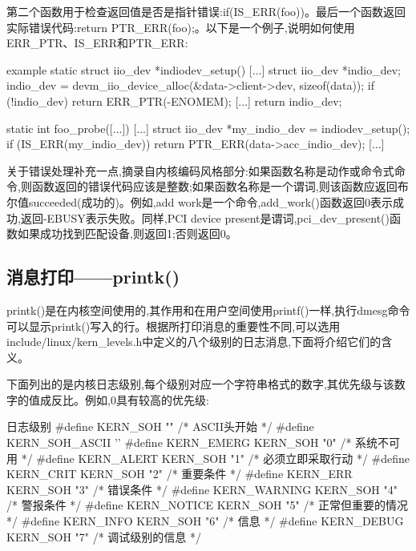\documentclass[lang=cn,newtx,10pt,scheme=chinese]{elegantbook}
\begin{document}
第二个函数用于检查返回值是否是指针错误:if(IS\_ERR(foo))。最后一个函数返回实际错误代码:return PTR\_ERR(foo);。以下是一个例子,说明如何使用ERR\_PTR、IS\_ERR和PTR\_ERR:

\begin{mycode}{example}
static struct iio_dev *indiodev_setup(){
    [...]
    struct iio_dev *indio_dev;
    indio_dev = devm_iio_device_alloc(&data->client->dev, sizeof(data));
    if (!indio_dev)
        return ERR_PTR(-ENOMEM);
    [...]
    return indio_dev;
}

static int foo_probe([...]){
    [...]
    struct iio_dev *my_indio_dev = indiodev_setup();
    if (IS_ERR(my_indio_dev))
        return PTR_ERR(data->acc_indio_dev);
    [...]
}
\end{mycode}

\begin{marker}
关于错误处理补充一点,摘录自内核编码风格部分:如果函数名称是动作或命令式命令,则函数返回的错误代码应该是整数;如果函数名称是一个谓词,则该函数应返回布尔值succeeded(成功的)。例如,add
work是一个命令,add\_work()函数返回0表示成功,返回-EBUSY表示失败。同样,PCI device present是谓词,pci\_dev\_present()函数如果成功找到匹配设备,则返回1;否则返回0。
\end{marker}

\subsection{消息打印——printk()}

printk()是在内核空间使用的,其作用和在用户空间使用printf()一样,执行dmesg命令可以显示printk()写入的行。根据所打印消息的重要性不同,可以选用include/linux/kern\_levels.h中定义的八个级别的日志消息,下面将介绍它们的含义。

下面列出的是内核日志级别,每个级别对应一个字符串格式的数字,其优先级与该数字的值成反比。例如,0具有较高的优先级:

\begin{mycode}{日志级别}
#define KERN_SOH                ""          /* ASCII头开始 */
#define KERN_SOH_ASCII          ''
#define KERN_EMERG              KERN_SOH "0"    /* 系统不可用 */
#define KERN_ALERT              KERN_SOH "1"    /* 必须立即采取行动 */
#define KERN_CRIT               KERN_SOH "2"    /* 重要条件 */
#define KERN_ERR                KERN_SOH "3"    /* 错误条件 */
#define KERN_WARNING            KERN_SOH "4"    /* 警报条件 */
#define KERN_NOTICE             KERN_SOH "5"    /* 正常但重要的情况 */
#define KERN_INFO               KERN_SOH "6"    /* 信息 */
#define KERN_DEBUG              KERN_SOH "7"    /* 调试级别的信息 */
\end{mycode}
\end{document}
